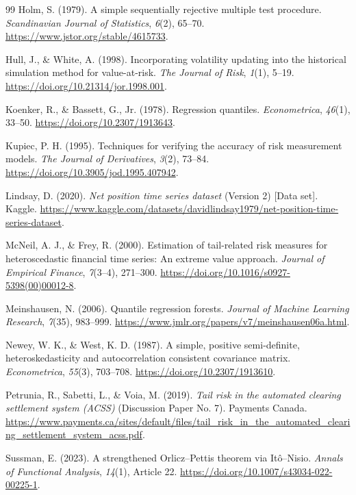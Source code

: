 \begin{thebibliography}{99}
 Holm, S. (1979). A simple sequentially rejective multiple test procedure. \emph{Scandinavian Journal of Statistics}, \emph{6}(2), 65--70. \url{https://www.jstor.org/stable/4615733}.

 Hull, J., \& White, A. (1998). Incorporating volatility updating into the historical simulation method for value-at-risk. \emph{The Journal of Risk}, \emph{1}(1), 5--19. \url{https://doi.org/10.21314/jor.1998.001}.

 Koenker, R., \& Bassett, G., Jr. (1978). Regression quantiles. \emph{Econometrica}, \emph{46}(1), 33--50. \url{https://doi.org/10.2307/1913643}.

 Kupiec, P. H. (1995). Techniques for verifying the accuracy of risk measurement models. \emph{The Journal of Derivatives}, \emph{3}(2), 73--84. \url{https://doi.org/10.3905/jod.1995.407942}.

 Lindsay, D. (2020). \emph{Net position time series dataset} (Version 2) [Data set]. Kaggle. \url{https://www.kaggle.com/datasets/davidlindsay1979/net-position-time-series-dataset}.

 McNeil, A. J., \& Frey, R. (2000). Estimation of tail-related risk measures for heteroscedastic financial time series: An extreme value approach. \emph{Journal of Empirical Finance}, \emph{7}(3--4), 271--300. \url{https://doi.org/10.1016/s0927-5398(00)00012-8}.

 Meinshausen, N. (2006). Quantile regression forests. \emph{Journal of Machine Learning Research}, \emph{7}(35), 983--999. \url{https://www.jmlr.org/papers/v7/meinshausen06a.html}.

 Newey, W. K., \& West, K. D. (1987). A simple, positive semi-definite, heteroskedasticity and autocorrelation consistent covariance matrix. \emph{Econometrica}, \emph{55}(3), 703--708. \url{https://doi.org/10.2307/1913610}.

 Petrunia, R., Sabetti, L., \& Voia, M. (2019). \emph{Tail risk in the automated clearing settlement system (ACSS)} (Discussion Paper No. 7). Payments Canada. \url{https://www.payments.ca/sites/default/files/tail_risk_in_the_automated_clearing_settlement_system_acss.pdf}.

 Sussman, E. (2023). A strengthened Orlicz--Pettis theorem via Itô--Nisio. \emph{Annals of Functional Analysis}, \emph{14}(1), Article 22. \url{https://doi.org/10.1007/s43034-022-00225-1}.


\end{thebibliography}

